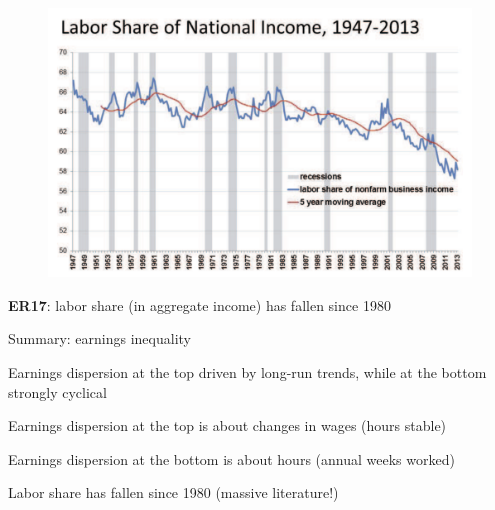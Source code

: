 \documentclass[11pt, aspectratio=169]{beamer}
\newenvironment{witemize}{\itemize\addtolength{\itemsep}{10pt}}{\enditemize}
\begin{document}
\begin{frame}{}
	\begin{figure}
		\includegraphics[scale=0.4]{./figures/inequality_earnings_7}
	\end{figure}

	\vspace{2mm}
	{\color{blue}\textbf{ER17}}: labor share (in aggregate income) has fallen since 1980
\end{frame}


\begin{frame}{Summary: earnings inequality}

\begin{witemize}
\item Earnings dispersion at the top driven by long-run trends, while at the bottom strongly cyclical

\item Earnings dispersion at the top is about changes in wages (hours stable)

\item Earnings dispersion at the bottom is about hours (annual weeks worked)

\item Labor share has fallen since 1980 (massive literature!)
\end{witemize}
\end{frame}
\end{document}
